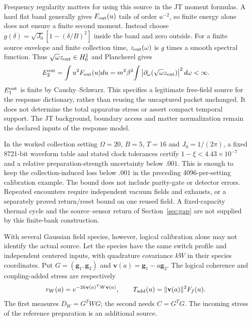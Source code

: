 \documentclass[12pt,a4paper]{article}
\begin{document}
Frequency regularity matters for using this source in the JT moment formulas.
A hard flat band generally gives $F_{\rm out}(u)$ tails of order $u^{-2}$,
so finite energy alone does not ensure a finite second moment. Instead choose
$g(\delta)=\sqrt{J_0}[1-(\delta/B)^2]$ inside the band and zero outside.
For a finite source envelope and finite collection time,
$z_{\rm out}(\omega)$ is $g$ times a smooth spectral function. Thus
$\sqrt\omega z_{\rm out}\in H^1_0$ and Plancherel gives
\begin{equation}
 E_2^{\rm out}=\int u^2F_{\rm out}(u)du
 =m^2\beta^2\!\int
 \left|\partial_\omega(\sqrt\omega z_{\rm out})\right|^2d\omega<\infty.
 \label{eq:band-second-moment}
\end{equation}
$E_1^{\rm out}$ is finite by Cauchy--Schwarz. This specifies a legitimate
free-field source for the response dictionary, rather than reusing the
uncaptured packet unchanged. It does not determine the total apparatus stress
or assert compact temporal support. The JT background, boundary access and
matter normalization remain the declared inputs of the response model.

In the worked collection setting $\Omega=20$, $B=5$, $T=16$ and
$J_0=1/(2\pi)$, a fixed 8721-bit waveform table and stated clock tolerances
certify $1-\xi<4.43\times10^{-7}$ and a relative preparation-strength
uncertainty below $.001$. This is enough to keep the collection-induced loss
below $.001$ in the preceding 4096-per-setting calibration example. The bound
does not include parity-gate or detector errors. Repeated encounters require
independent vacuum fields and exhausts, or a separately proved return/reset
bound on one reused field. A fixed-capacity thermal cycle and the source--sensor
return of Section~\ref{sec:gap} are not supplied by this finite-bank construction.

With several Gaussian field species, however, logical calibration alone may
not identify the actual source. Let the species have the same switch profile
and independent centered inputs, with quadrature covariance $kW$ in their
species coordinates. Put $G=(\mathbf g_1,\mathbf g_2)$ and
$\mathbf v(a)=\mathbf g_1-a\mathbf g_2$. The logical coherence and
coupling-added stress are respectively
\begin{equation}
 r_W(a)=e^{-2k\mathbf v(a)^TW\mathbf v(a)},\qquad
 T_{\rm add}(u)=\|\mathbf v(a)\|^2F_f(u).
 \label{eq:weighted-noise-source}
\end{equation}
The first measures $D_W=G^TWG$; the second needs $C=G^TG$.
The incoming stress of the reference preparation is an additional source.
\end{document}
